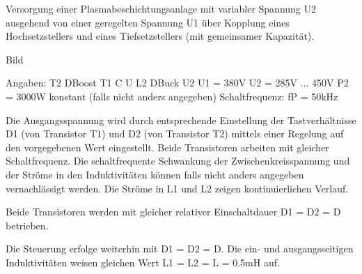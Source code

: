 
Versorgung einer Plasmabeschichtungsanlage mit variabler Spannung U2 ausgehend von einer
geregelten Spannung U1 über Kopplung eines Hochsetzstellers und eines Tiefsetzstellers (mit
gemeinsamer Kapazität).


Bild


Angaben:
T2
DBoost
T1
C
U
L2
DBuck
U2
U1 = 380V
U2 = 285V ... 450V
P2 = 3000W konstant (falls nicht anders angegeben)
Schaltfrequenz: fP = 50kHz


Die Ausgangsspannung wird durch entsprechende Einstellung der Tastverhältnisse D1 (von Transistor
T1) und D2 (von Transistor T2) mittels einer Regelung auf den vorgegebenen Wert eingestellt. Beide
Transistoren arbeiten mit gleicher Schaltfrequenz. Die schaltfrequente Schwankung der
Zwischenkreisspannung und der Ströme in den Induktivitäten können falls nicht anders
angegeben vernachlässigt werden. Die Ströme in L1 und L2 zeigen kontinuierlichen Verlauf.

Beide Transistoren werden mit gleicher relativer Einschaltdauer D1 = D2 = D betrieben.





Die Steuerung erfolge weiterhin mit D1 = D2 = D. Die ein- und ausgangsseitigen Induktivitäten
weisen gleichen Wert L1 = L2 = L = 0.5mH auf.




